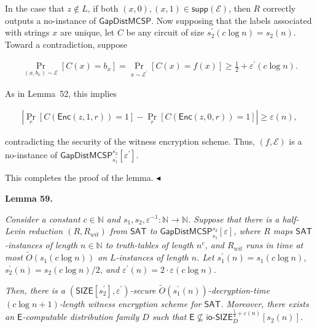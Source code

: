In the case that $z\notin L$, if both $(x,0),(x,1)\in{\mathsf{supp}}(\mathcal{E})$, then $R$ correctly outputs a no-instance of ${\mathsf{GapDistMCSP}}$. Now supposing that the labels associated with strings $x$ are unique, let $C$ be any circuit of size $s_{2}^{\prime}(c\log n)=s_{2}(n)$. Toward a contradiction, suppose\par


\[\begin{gathered}
\Pr_{(x,b_{x})\sim\mathcal{E}}[C(x)=b_{x}]=\Pr_{x\sim\mathcal{E^{\prime}}}[C(x)=f(x)]\geq\frac{1}{2}+\varepsilon^{\prime}(c\log n).
\end{gathered}\]


As in Lemma 52, this implies\par


\[\begin{gathered}
\left|\Pr_{r}[C({\mathsf{Enc}}(z,1,r))=1]-\Pr_{r}[C({\mathsf{Enc}}(z,0,r))=1]\right|\geq\varepsilon(n),
\end{gathered}\]


contradicting the security of the witness encryption scheme. Thus, $(f,\mathcal{E})$ is a no-instance of ${\mathsf{GapDistMCSP}}_{s_{1}^{\prime}}^{s_{2}^{\prime}}[\varepsilon^{\prime}]$.\par




This completes the proof of the lemma.
$\blacktriangleleft$\par





\par\medskip\noindent\textbf{
\textbf{Lemma 59}\textbf{.}
}\par



\emph{Consider a constant $c\in\mathbb{N}$ and $s_{1},s_{2},\varepsilon^{-1}:\mathbb{N}\to\mathbb{N}$. Suppose that there is a half-Levin reduction $(R,R_{wit})$ from ${\mathsf{SAT}}$ to ${\mathsf{GapDistMCSP}}_{s_{1}}^{s_{2}}[\varepsilon]$, where $R$ maps ${\mathsf{SAT}}$-instances of length $n\in\mathbb{N}$ to truth-tables of length $n^{c}$, and $R_{wit}$ runs in time at most $\widetilde{O}(s_{1}(c\log n))$ on $L$-instances of length $n$. Let $s_{1}^{\prime}(n)=s_{1}(c\log n)$, $s_{2}^{\prime}(n)=s_{2}(c\log n)/2$, and $\varepsilon^{\prime}(n)=2\cdot\varepsilon(c\log n)$.}\par




\emph{Then, there is a $({\mathsf{SIZE}}[s_{2}^{\prime}],\varepsilon^{\prime})$-secure $\widetilde{O}(s_{1}^{\prime}(n))$-decryption-time $(c\log n+1)$-length witness encryption scheme for ${\mathsf{SAT}}$. Moreover, there exists an ${\mathsf{E}}$-computable distribution family $D$ such that ${\mathsf{E}}\nsubseteq{\mathsf{io\text{-}}}{\mathsf{SIZE}}_{D}^{\frac{1}{2}+\varepsilon(n)}[s_{2}(n)]$.}\par



